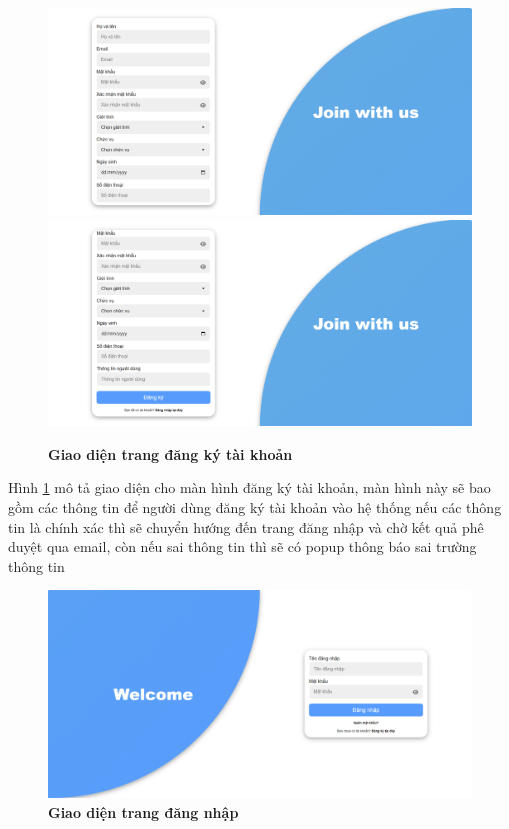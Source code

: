 \begin{figure}[H]
  \centering
  \includegraphics[scale=0.4]{Images/server/webUI/register_1.png}
  \includegraphics[scale=0.4]{Images/server/webUI/register_2.png}
  \caption[Giao diện trang đăng ký tài khoản]{\bfseries \fontsize{12pt}{0pt}\selectfont Giao diện trang đăng ký tài khoản}
  \label{register} %
\end{figure}

Hình \ref{register} mô tả giao diện cho màn hình đăng ký tài khoản, màn hình này sẽ bao
 gồm các thông tin để người dùng đăng ký tài khoản vào hệ thống
 nếu các thông tin là chính xác thì sẽ chuyển hướng đến trang đăng nhập và chờ kết quả phê duyệt qua email, 
 còn nếu sai thông tin thì sẽ có popup thông báo sai trường thông tin

\begin{figure}[H]
  \centering
  \includegraphics[scale=0.4]{Images/server/webUI/login.png}
  \caption[Giao diện trang đăng nhập]{\bfseries \fontsize{12pt}{0pt}\selectfont Giao diện trang đăng nhập}
  \label{login} %
\end{figure}

